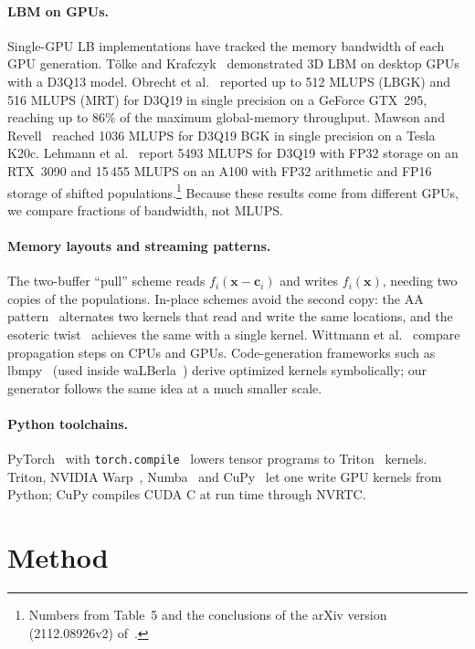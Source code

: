\documentclass[11pt]{article}
\begin{document}
\paragraph{LBM on GPUs.}
Single-GPU LB implementations have tracked the memory bandwidth of each GPU generation.
T\"olke and Krafczyk~\citep{tolke2008} demonstrated 3D LBM on desktop GPUs with a D3Q13
model. Obrecht et al.~\citep{obrecht2011} reported up to 512 MLUPS (LBGK) and 516 MLUPS
(MRT) for D3Q19 in single precision on a GeForce GTX~295, reaching up to 86\% of the maximum
global-memory throughput. Mawson and Revell~\citep{mawson2014} reached 1036 MLUPS for D3Q19
BGK in single precision on a Tesla K20c. Lehmann et al.~\citep{lehmann2022} report
5493 MLUPS for D3Q19 with FP32 storage on an RTX~3090 and 15\,455 MLUPS on an A100 with
FP32 arithmetic and FP16 storage of shifted populations.\footnote{Numbers from Table~5 and
the conclusions of the arXiv version (2112.08926v2) of~\citep{lehmann2022}.} Because these
results come from different GPUs, we compare fractions of bandwidth, not MLUPS.

\paragraph{Memory layouts and streaming patterns.}
The two-buffer ``pull'' scheme reads $f_i(\mathbf{x}-\mathbf{c}_i)$ and writes $f_i(\mathbf{x})$,
needing two copies of the populations. In-place schemes avoid the second copy: the AA
pattern~\citep{bailey2009} alternates two kernels that read and write the same locations, and
the esoteric twist~\citep{geier2017} achieves the same with a single kernel. Wittmann et
al.~\citep{wittmann2013} compare propagation steps on CPUs and GPUs. Code-generation
frameworks such as lbmpy~\citep{bauer2021lbmpy} (used inside waLBerla~\citep{bauer2021walberla})
derive optimized kernels symbolically; our generator follows the same idea at a much smaller
scale.

\paragraph{Python toolchains.}
PyTorch~\citep{paszke2019} with \texttt{torch.compile}~\citep{ansel2024} lowers tensor
programs to Triton~\citep{tillet2019} kernels. Triton, NVIDIA Warp~\citep{warp2022},
Numba~\citep{lam2015} and CuPy~\citep{okuta2017} let one write GPU kernels from Python;
CuPy compiles CUDA C at run time through NVRTC.

\section{Method}
\end{document}
